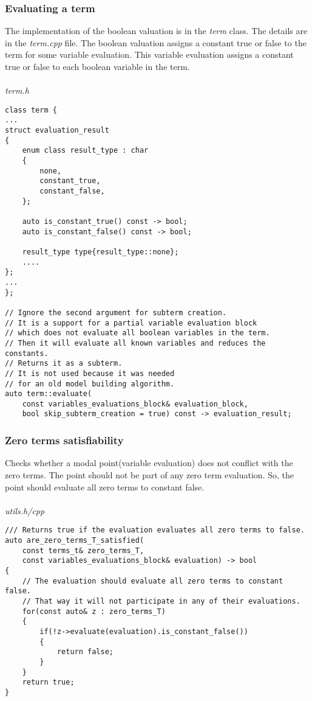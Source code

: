 \documentclass{article}
\begin{document}
	\newpage
	\subsubsection*{Evaluating a term}
	The implementation of the boolean valuation is in the \textit{term} class. The details are in the \textit{term.cpp} file.
	The boolean valuation assigns a constant true or false to the term for some variable evaluation. This variable evaluation assigns a constant true or false to each boolean variable in the term.
	\\
	\\
\noindent
\textit{term.h}
\begin{lstlisting}
class term {
...
struct evaluation_result
{
    enum class result_type : char
    {
        none,
        constant_true,
        constant_false,
    };

    auto is_constant_true() const -> bool;
    auto is_constant_false() const -> bool;

    result_type type{result_type::none};
	....
};
...
};

// Ignore the second argument for subterm creation.
// It is a support for a partial variable evaluation block
// which does not evaluate all boolean variables in the term.
// Then it will evaluate all known variables and reduces the constants.
// Returns it as a subterm.
// It is not used because it was needed
// for an old model building algorithm.
auto term::evaluate(
	const variables_evaluations_block& evaluation_block,
	bool skip_subterm_creation = true) const -> evaluation_result;
\end{lstlisting}

	\newpage
	\subsubsection*{Zero terms satisfiability}
	Checks whether a modal point(variable evaluation) does not conflict with the zero terms. The point should not be part of any zero term evaluation. So, the point should evaluate all zero terms to constant false.
	\\
	\\
\noindent
\textit{utils.h/cpp}
\begin{lstlisting}
/// Returns true if the evaluation evaluates all zero terms to false.
auto are_zero_terms_T_satisfied(
	const terms_t& zero_terms_T,
	const variables_evaluations_block& evaluation) -> bool
{
    // The evaluation should evaluate all zero terms to constant false.
    // That way it will not participate in any of their evaluations.
    for(const auto& z : zero_terms_T)
    {
        if(!z->evaluate(evaluation).is_constant_false())
        {
            return false;
        }
    }
    return true;
}
\end{lstlisting}
\end{document}
